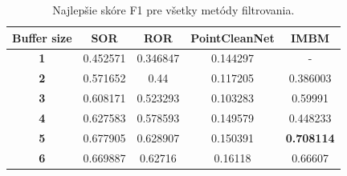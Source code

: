\begin{table}[H]
	\caption{\label{tab:final_comp} Najlepšie skóre F1 pre všetky metódy filtrovania. }
	\centering
	\begin{tabular}{ccccc}
		\toprule
		\textbf{Buffer size} & \textbf{SOR} & \textbf{ROR} & \textbf{PointCleanNet} & \textbf{IMBM}     \\ 
		\midrule
		\textbf{1}           & 0.452571     & 0.346847     & 0.144297               & -                 \\ 
		\textbf{2}           & 0.571652     & 0.44         & 0.117205               & 0.386003          \\ 
		\textbf{3}           & 0.608171     & 0.523293     & 0.103283               & 0.59991           \\ 
		\textbf{4}           & 0.627583     & 0.578593     & 0.149579               & 0.448233          \\ 
		\textbf{5}           & 0.677905     & 0.628907     & 0.150391               & \textbf{0.708114} \\ 
		\textbf{6}           & 0.669887     & 0.62716      & 0.16118                & 0.66607           \\ 
		\bottomrule
	\end{tabular}
\end{table}

